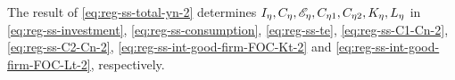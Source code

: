\documentclass[../thesis.tex]{subfiles}
\begin{document}

\begin{comment}
	For region $\eta = 1$, substitute \ref{eq:reg-ss-investment}, \ref{eq:reg-ss-C1-Cn-3} and \ref{eq:reg-ss-C2-Cn-3} in \ref{eq:reg-ss-total-yn}:
	\begin{alignat}{2}
		Y_{\eta} &= C_{\eta 1} + C_{\eta 2} + I_{\eta} &\implies \tag{\ref{eq:reg-ss-total-yn}} \\
		Y_{1} &= C_{11} + C_{12} + I_{1} &\implies \nonumber \\
		Y_{1} &= \left( \frac{\omega_{11}}{1 -\omega_{11}} \right)^{1 -\omega_{11}} a_{1} Y_{1}^{\frac{-\varphi}{\sigma}} + \left( \frac{\omega_{11}}{1 -\omega_{11}} \right)^{1 -\omega_{11}} a_{1} Y_{1}^{\frac{-\varphi}{\sigma}} + b_{1} Y_{1} &\implies \nonumber \\
		Y_{1} &= \left[ \left( \frac{a_{1}}{1 - b_{1}} \right) \left( \frac{1}{\omega_{11}^{\omega_{11}} (1 - \omega_{11})^{1 - \omega_{11}}} \right) \right]^{\frac{\sigma}{\sigma + \varphi}} \label{eq:reg-ss-total-y1}
	\end{alignat}
	
	For region $\eta = 2$, substitute \ref{eq:reg-ss-investment}, \ref{eq:reg-ss-C2-Cn-3} and \ref{eq:reg-ss-C1-Cn-3} in \ref{eq:reg-ss-total-yn}:
	\begin{alignat}{2}
		Y_{\eta} &= C_{\eta 1} + C_{\eta 2} + I_{\eta} &\implies \tag{\ref{eq:reg-ss-total-yn}} \\
		Y_{2} &= C_{21} + C_{22} + I_{2} &\implies \nonumber \\
		Y_{2} &= \left( \frac{\omega_{21}}{1 -\omega_{21}} \right)^{1 -\omega_{21}} a_{2} Y_{2}^{\frac{-\varphi}{\sigma}} + \left( \frac{\omega_{21}}{1 -\omega_{21}} \right)^{1 -\omega_{21}} a_{2} Y_{2}^{\frac{-\varphi}{\sigma}} + b_{2} Y_{2} &\implies \nonumber \\
		Y_{2} &= \left[ \left( \frac{a_{2}}{1 - b_{2}} \right) \left( \frac{1}{\omega_{21}^{\omega_{21}} (1 - \omega_{21})^{1 - \omega_{21}}} \right) \right]^{\frac{\sigma}{\sigma + \varphi}} \label{eq:reg-ss-total-y2}
	\end{alignat}
\end{comment}

	The result of \ref{eq:reg-ss-total-yn-2} determines $I_{\eta}, C_{\eta}, \te[],  C_{\eta 1}, C_{\eta 2}, K_{\eta}, L_{\eta}$ in \ref{eq:reg-ss-investment}, \ref{eq:reg-ss-consumption}, \ref{eq:reg-ss-te},  \ref{eq:reg-ss-C1-Cn-2}, \ref{eq:reg-ss-C2-Cn-2}, \ref{eq:reg-ss-int-good-firm-FOC-Kt-2} and \ref{eq:reg-ss-int-good-firm-FOC-Lt-2}, respectively.
\end{document}
